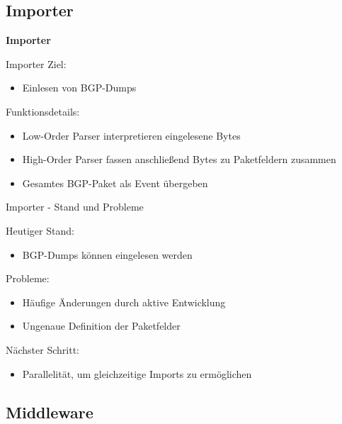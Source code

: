 \documentclass[9pt]{beamer}
\begin{document}
\subsection{Importer}

\begin{frame}{}
	\begin{center}
		\LARGE \textbf{Importer}
	\end{center}
\end{frame}

\begin{frame}{Importer}{}
   Ziel:
   	\begin{itemize}
   	\item Einlesen von BGP-Dumps
   	\end{itemize}
   	\vspace{0,2cm}
   Funktionsdetails:
	\begin{itemize}
		\item Low-Order Parser interpretieren eingelesene Bytes
		\item High-Order Parser fassen anschließend Bytes zu Paketfeldern zusammen
		\item Gesamtes BGP-Paket als Event übergeben
	\end{itemize}
\end{frame}

\begin{frame}{Importer - Stand und Probleme}{}

	Heutiger Stand:
	\begin{itemize}
		\item BGP-Dumps können eingelesen werden
	\end{itemize}
	\vspace{0,2cm}
	Probleme:
	\begin{itemize}
		\item  Häufige Änderungen durch aktive Entwicklung
		\item Ungenaue Definition der Paketfelder
	\end{itemize}
	\vspace{0,2cm}
	Nächster Schritt:
	\begin{itemize}
		\item Parallelität, um gleichzeitige Imports zu ermöglichen
	\end{itemize}

\end{frame}

\subsection{Middleware}
\end{document}
